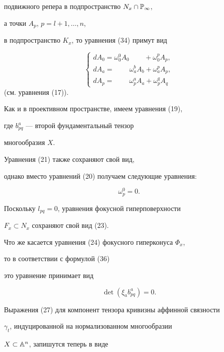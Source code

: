 подвижного репера в подпространство $N_x \cap \Bbb{P}_\infty$,


а точки $A_p$, $p = l+1, \dotsc, n$,


в подпространство $K_x$, то уравнения (34) примут вид


\begin{equation}\label{eq:47}


\begin{cases}
dA_0 = \omega^0_0 A_0\phantom{\omega_a^b A_b} + \omega^p_0 A_p, \\
dA_a =\phantom{\omega^0_0 A_0} \omega_a^b A_b +\omega^p_a A_p,\\
dA_p =\phantom{\omega^0_0 A_0} \omega_p^a A_a + \omega^q_p A_q
\end{cases}


\end{equation}
(см. уравнения (17)).





Как и в проективном пространстве, имеем уравнения (19),


где $b_{pq}^a$ --- второй фундаментальный тензор


многообразия $X$.


 Уравнения (21) также сохраняют свой вид,


однако вместо уравнений (20) получаем следующие уравнения:


\begin{equation}\label{eq:50}
\omega_p^0 = 0.
\end{equation}



Поскольку $l_{pq} = 0$, уравнения фокусной гиперповерхности


$F_x \subset N_x$ сохраняют свой вид (23).


Что же касается уравнения (24) фокусного гиперконуса $\Phi_x$,


то в соответствии с формулой (36)


это уравнение принимает вид


\begin{equation}\label{eq:52}
\det (\xi_a b^a_{pq}) = 0.
\end{equation}



Выражения (27) для компонент тензора кривизны аффинной связности


$\gamma_t$, индуцированной на нормализованном многообразии


$X\subset \Bbb{A}^n$, запишутся теперь в виде


